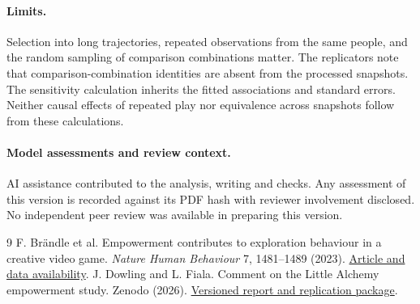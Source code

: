 \documentclass[11pt]{article}
\begin{document}
\paragraph{Limits.} Selection into long trajectories, repeated observations from the same people, and the random sampling of comparison combinations matter. The replicators note that comparison-combination identities are absent from the processed snapshots. The sensitivity calculation inherits the fitted associations and standard errors. Neither causal effects of repeated play nor equivalence across snapshots follow from these calculations.
\paragraph{Model assessments and review context.} AI assistance contributed to the analysis, writing and checks. Any assessment of this version is recorded against its PDF hash with reviewer involvement disclosed. No independent peer review was available in preparing this version.
\begin{thebibliography}{9}
 F. Br\"andle et al. Empowerment contributes to exploration behaviour in a creative video game. \emph{Nature Human Behaviour} 7, 1481--1489 (2023). \href{https://doi.org/10.1038/s41562-023-01661-2}{Article and data availability}.
 J. Dowling and L. Fiala. Comment on the Little Alchemy empowerment study. Zenodo (2026). \href{https://doi.org/10.5281/zenodo.24409714}{Versioned report and replication package}.
\end{thebibliography}
\end{document}
